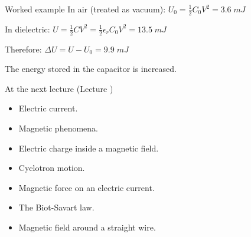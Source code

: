 {\begin{frame}{Worked example}
In air (treated as vacuum): $\displaystyle U_0 = \frac{1}{2} C_0 V^2 = 3.6 \; mJ$\\
\vspace{0.2cm}

In dielectric: $\displaystyle U = \frac{1}{2} C V^2 = \frac{1}{2} \epsilon_r C_0 V^2 = 13.5 \; mJ$\\
\vspace{0.2cm}

Therefore: $\displaystyle  {\Delta}U = U - U_0 = 9.9 \; mJ$\\
\vspace{0.4cm}

The energy stored in the capacitor is increased.

\end{frame}


} %




%
%

\renewcommand{\lecturesummarytitle}{Main points to remember }


%
%

\begin{frame}{At the next lecture (Lecture \nextlecture)}

\begin{itemize}
\item Electric current.
\item Magnetic phenomena.
\item Electric charge inside a magnetic field.
\item Cyclotron motion.
\item Magnetic force on an electric current.
\item The Biot-Savart law.
\item Magnetic field around a straight wire.
\end{itemize}

\end{frame}

%
%



